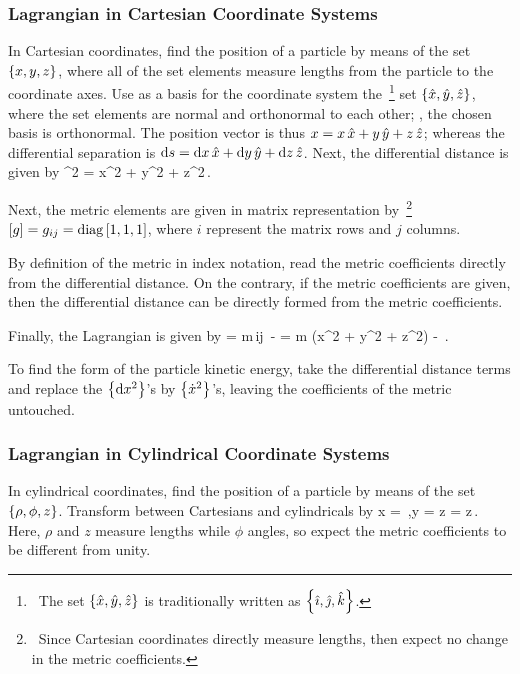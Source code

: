 \subsubsection{Lagrangian in Cartesian Coordinate Systems}
In Cartesian coordinates, find the position of a particle by means of the set $\left\lbrace{x,y,z}\right\rbrace$, where all of the set elements measure lengths from the particle to the coordinate axes. Use as a basis for the coordinate system the~\footnote{~The set $\left\lbrace{\hat{x}, \hat{y}, \hat{z}}\right\rbrace$ is traditionally written as $\left\lbrace{\hat\imath, \hat\jmath, \hat k}\right\rbrace$.} set $\left\lbrace{\hat{x}, \hat{y}, \hat{z}}\right\rbrace$, where the set elements are normal and orthonormal to each other; \ie, the chosen basis is orthonormal. The position vector is thus $x = x\,\hat{x} + y\,\hat{y} + z\,\hat{z}$; whereas the differential separation is $\text{d}s = \text{d} x\,\hat{x} + \text{d} y\,\hat{y} + \text{d} z\,\hat{z}$. Next, the differential distance is given by
\beq
\dx\svec^2 = \dx x^2 + \dx y^2 + \dx z^2\,.
\eeq

Next, the metric elements are given in matrix representation by~\footnote{~Since Cartesian coordinates directly measure lengths, then expect no change in the metric coefficients.} $\left[{g}\right] = g_{{i}{j}} = \operatorname{diag}\left[{1,1,1}\right]$, where $i$ represent the matrix rows and $j$ columns.

\begin{note}
By definition of the metric in index notation, read the metric coefficients directly from the differential distance. On the contrary, if the metric coefficients are given, then the differential distance can be directly formed from the metric coefficients.
\end{note}

Finally, the Lagrangian is given by
\beq
\lag =  m\,\imet ij\, - \pen{} 
     =  m (\dt x^2 + \dt y^2 + \dt z^2) - \pen{} \,.
\eeq

\begin{note}
To find the form of the particle kinetic energy, take the differential distance terms and replace the $\left\lbrace{\text{d}x^2}\right\rbrace$'s by $\left\lbrace{\dot{x}^2}\right\rbrace$'s, leaving the coefficients of the metric untouched.
\end{note}


\subsubsection{Lagrangian in Cylindrical Coordinate Systems}
In cylindrical coordinates, find the position of a particle by means of the set $\left\lbrace{\rho,\phi,z}\right\rbrace$. Transform between Cartesians and cylindricals by
\beq
x = \rho\cos\phi\,,\qquad y = \rho\sin\phi\qquad{}\qquad z = z\,.
\eeq
Here, $\rho$ and $z$ measure lengths while $\phi$ angles, so expect the metric coefficients to be different from unity.

